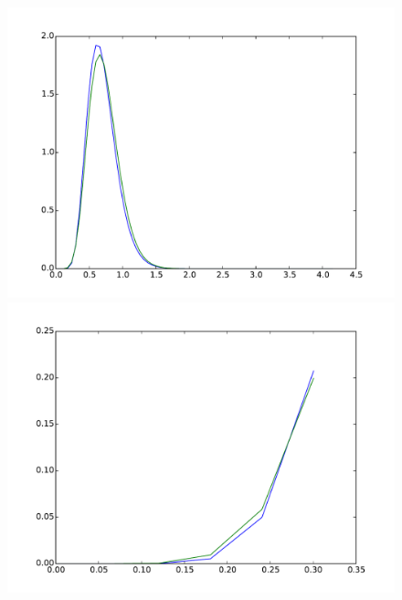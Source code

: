 \documentclass{article}
\begin{document}
\begin{figure}[htb]
	\centering
	\begin{minipage}{.45\textwidth}
		\centering
		\includegraphics[width=0.97\linewidth]{bootstrap-filter/global_simple_3_3.pdf}
	\end{minipage}
	\begin{minipage}{.45\textwidth}
		\centering
		\includegraphics[width=0.97\linewidth]{bootstrap-filter/beginning_simple_3_3.pdf}
	\end{minipage}
	\begin{minipage}{.45\textwidth}
		\centering

\end{minipage}
\end{figure}
\end{document}
